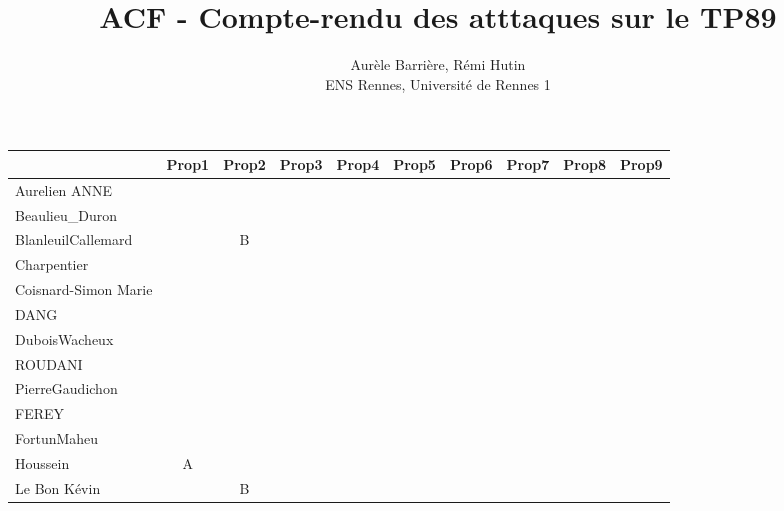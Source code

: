 \documentclass[a4paper]{article}
\begin{document}
\title{ACF - Compte-rendu des atttaques sur le TP89}
\author{Aurèle Barrière, Rémi Hutin \\ ENS Rennes, Université de Rennes 1}

\maketitle

\begin{table}[h!]
\small
\begin{tabular}{|l|c|c|c|c|c|c|c|c|c|} 
   \hline
                            & Prop1 & Prop2 & Prop3 & Prop4 & Prop5 & Prop6 & Prop7 & Prop8 & Prop9 \\ \hline \hline
    Aurelien ANNE           &       &       &       &       &       &       &       &       &       \\ \hline
    Beaulieu\_Duron         &       &       &       &       &       &       &       &       &       \\ \hline
    BlanleuilCallemard      &       & B     &       &       &       &       &       &       &       \\ \hline
    Charpentier             &       &       &       &       &       &       &       &       &       \\ \hline
    Coisnard-Simon Marie    &       &       &       &       &       &       &       &       &       \\ \hline
    DANG                    &       &       &       &       &       &       &       &       &       \\ \hline
    DuboisWacheux           &       &       &       &       &       &       &       &       &       \\ \hline
    ROUDANI                 &       &       &       &       &       &       &       &       &       \\ \hline
    PierreGaudichon         &       &       &       &       &       &       &       &       &       \\ \hline
    FEREY                   &       &       &       &       &       &       &       &       &       \\ \hline
    FortunMaheu             &       &       &       &       &       &       &       &       &       \\ \hline
    Houssein                & A     &       &       &       &       &       &       &       &       \\ \hline
    Le Bon Kévin            &       & B     &       &       &       &       &       &       &       \\ \hline

\end{tabular}
\end{table}
\end{document}
